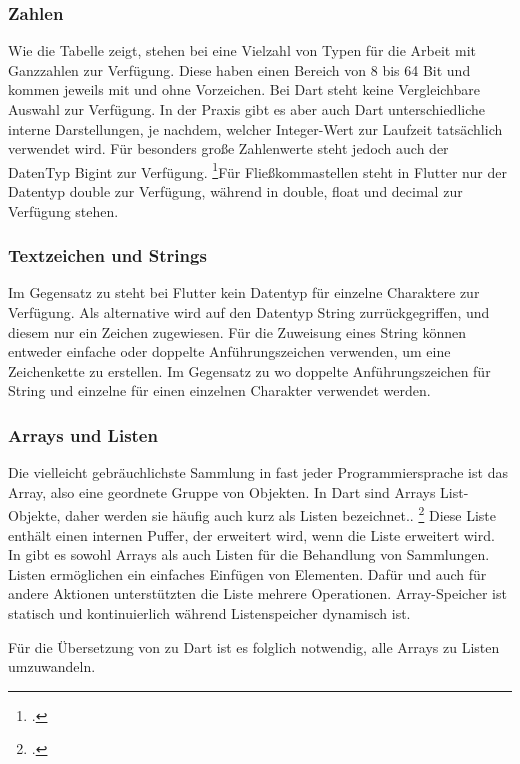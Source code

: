 \subsubsection{Zahlen}
Wie die Tabelle zeigt, stehen bei \Csharp eine Vielzahl von Typen für die Arbeit mit Ganzzahlen zur Verfügung.  Diese haben einen Bereich von 8 bis 64 Bit und kommen jeweils mit und ohne Vorzeichen.  Bei Dart steht keine Vergleichbare Auswahl zur Verfügung.  In der Praxis gibt es aber auch Dart unterschiedliche interne Darstellungen,  je nachdem,  welcher Integer-Wert zur Laufzeit tatsächlich verwendet wird. Für besonders große Zahlenwerte steht jedoch auch der DatenTyp Bigint zur Verfügung.  \footcite[Vgl. ][Abgerufen am \today]{Ford2019}Für Fließkommastellen steht in Flutter nur der Datentyp double zur Verfügung, während in \Csharp double,  float und decimal zur Verfügung stehen.
\subsubsection{Textzeichen und Strings}

Im Gegensatz zu \Csharp steht bei Flutter kein Datentyp für einzelne Charaktere zur Verfügung.  Als alternative wird auf den Datentyp String zurrückgegriffen,  und diesem nur ein Zeichen zugewiesen.  Für die Zuweisung eines String können entweder einfache oder doppelte Anführungszeichen verwenden, um eine Zeichenkette zu erstellen. Im Gegensatz zu \Csharp  wo doppelte Anführungszeichen für String und einzelne für einen einzelnen Charakter verwendet werden.

\subsubsection{Arrays und Listen}
Die vielleicht gebräuchlichste Sammlung in fast jeder Programmiersprache ist das Array, also eine geordnete Gruppe von Objekten.  In Dart sind Arrays List-Objekte, daher werden sie häufig auch kurz als Listen bezeichnet.. \footcite[Vgl. ][Abgerufen am \today]{GoogleFlutterTour2020}  Diese Liste enthält einen internen Puffer, der erweitert wird, wenn die Liste erweitert wird.  In \Csharp gibt es sowohl Arrays als auch Listen für die Behandlung von Sammlungen.  Listen ermöglichen ein einfaches Einfügen von Elementen.  Dafür und auch für andere Aktionen unterstützten die Liste mehrere Operationen.  Array-Speicher ist statisch und kontinuierlich während Listenspeicher dynamisch ist. 

Für die Übersetzung von \Csharp zu Dart ist es folglich notwendig, alle Arrays zu Listen umzuwandeln.
